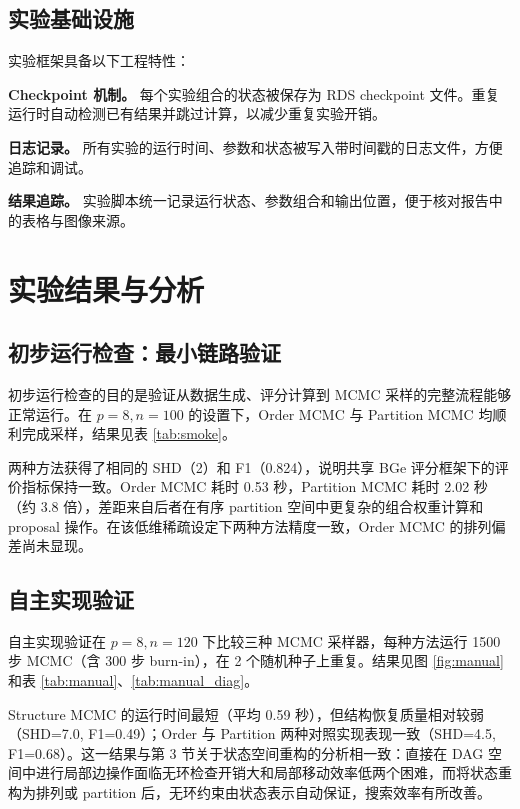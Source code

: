\documentclass[UTF8,a4paper,12pt]{ctexart}
\begin{document}
\subsection{实验基础设施}

实验框架具备以下工程特性：

\textbf{Checkpoint 机制。} 每个实验组合的状态被保存为 RDS checkpoint 文件。重复运行时自动检测已有结果并跳过计算，以减少重复实验开销。

\textbf{日志记录。} 所有实验的运行时间、参数和状态被写入带时间戳的日志文件，方便追踪和调试。

\textbf{结果追踪。} 实验脚本统一记录运行状态、参数组合和输出位置，便于核对报告中的表格与图像来源。

\FloatBarrier
\newpage
\section{实验结果与分析}

\subsection{初步运行检查：最小链路验证}

初步运行检查的目的是验证从数据生成、评分计算到 MCMC 采样的完整流程能够正常运行。在 $p=8, n=100$ 的设置下，Order MCMC 与 Partition MCMC 均顺利完成采样，结果见表 \ref{tab:smoke}。

两种方法获得了相同的 SHD（2）和 F1（0.824），说明共享 BGe 评分框架下的评价指标保持一致。Order MCMC 耗时 0.53 秒，Partition MCMC 耗时 2.02 秒（约 3.8 倍），差距来自后者在有序 partition 空间中更复杂的组合权重计算和 proposal 操作。在该低维稀疏设定下两种方法精度一致，Order MCMC 的排列偏差尚未显现。



\subsection{自主实现验证}

自主实现验证在 $p=8, n=120$ 下比较三种 MCMC 采样器，每种方法运行 1500 步 MCMC（含 300 步 burn-in），在 2 个随机种子上重复。结果见图 \ref{fig:manual} 和表 \ref{tab:manual}、\ref{tab:manual_diag}。

Structure MCMC 的运行时间最短（平均 0.59 秒），但结构恢复质量相对较弱（SHD=7.0, F1=0.49）；Order 与 Partition 两种对照实现表现一致（SHD=4.5, F1=0.68）。这一结果与第 3 节关于状态空间重构的分析相一致：直接在 DAG 空间中进行局部边操作面临无环检查开销大和局部移动效率低两个困难，而将状态重构为排列或 partition 后，无环约束由状态表示自动保证，搜索效率有所改善。
\end{document}

